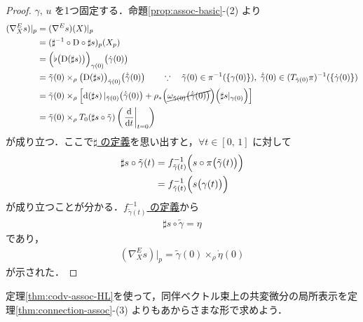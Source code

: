 \documentclass[TQFT_main]{subfiles}
\begin{document}
\begin{proof}
    $\gamma,\, u$ を1つ固定する．命題\ref{prop:assoc-basic}-(2) より
    \begin{align}
        (\nabla^E_X s)|_p
        &= (\nabla^E s)(X)|_p \\
        &= (\sharp^{-1} \circ \codd{} \circ \sharp s)_p (X_p) \\
        &= \Bigl( \flat\bigl(\codd{(\sharp s)} \bigr)\Bigr)_{\gamma(0)} \bigl( \dot{\gamma}(0) \bigr) \\
        &= \tilde{\gamma}(0) \times_\rho \bigl(\codd{(\sharp s)}\bigr)_{\tilde{\gamma}(0)} \bigl( \dot{\tilde{\gamma}} (0) \bigr) \qquad \because\quad \tilde{\gamma}(0) \in \pi^{-1} (\{\gamma(0)\}),\; \dot{\tilde{\gamma}}(0) \in (T_{\tilde{\gamma}(0)} \pi)^{-1} (\{\dot{\gamma} (0)\})\\
        &= \tilde{\gamma}(0) \times_\rho \left[ \dd (\sharp s)|_{\tilde{\gamma}(0)} \bigl( \dot{\tilde{\gamma}}(0) \bigr)  + \rho_* \Bigl( \cancel{\omega_{\tilde{\gamma}(0)}\bigl(\dot{\tilde{\gamma}}(0)\bigr)} \Bigr)\Bigl( \sharp s|_{\gamma(0)} \Bigr)    \right] \\
        &= \tilde{\gamma}(0) \times_\rho T_0(\sharp s \circ \tilde{\gamma}) \left( \eval{\dv{}{t}}_{t=0} \right)
    \end{align}
    が成り立つ．ここで\hyperref[prop:assoc-basic]{$\sharp$ の定義}を思い出すと，$\forall t \in [0,\, 1]$ に対して
    \begin{align}
        \sharp s \circ \tilde{\gamma}(t) 
        &= f^{-1}_{\tilde{\gamma}(t)} \Bigl( s \circ \pi \bigl( \tilde{\gamma}(t) \bigr)  \Bigr) \\
        &= f^{-1}_{\tilde{\gamma}(t)} \Bigl( s \bigl( \gamma(t) \bigr) \Bigr)
    \end{align}
    が成り立つことが分かる．\hyperref[lem:assoc-basic]{$f^{-1}_{\tilde{\gamma}(t)}$ の定義}から
    \begin{align}
        \sharp s \circ \tilde{\gamma} = \eta
    \end{align}
    であり，
    \begin{align}
        (\nabla^E_X s)|_p = \tilde{\gamma}(0) \times_\rho \dot{\eta}(0)
    \end{align}
    が示された．
\end{proof}

定理\ref{thm:codv-assoc-HL}を使って，同伴ベクトル束上の共変微分の局所表示を定理\ref{thm:connection-assoc}-(3) よりもあからさまな形で求めよう．
\end{document}
